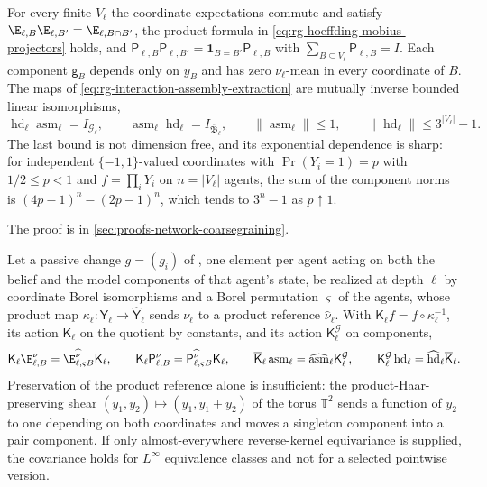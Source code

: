 For every finite $V_\ell$ the coordinate expectations commute and satisfy
$\E_{\ell,B}\E_{\ell,B'}=\E_{\ell,B\cap B'}$, the product formula
in \eqref{eq:rg-hoeffding-mobius-projectors} holds, and
$\mathsf P_{\ell,B}\mathsf P_{\ell,B'}=\mathbf 1_{B=B'}\mathsf P_{\ell,B}$ with
$\sum_{B\subseteq V_\ell}\mathsf P_{\ell,B}=I$. Each component $\mathsf g_B$
depends only on $y_B$ and has zero $\nu_\ell$-mean in every coordinate of $B$. The
maps of \eqref{eq:rg-interaction-assembly-extraction} are mutually inverse bounded
linear isomorphisms,
\begin{equation}
\operatorname{hd}_\ell\operatorname{asm}_\ell=I_{\mathcal G_\ell},
\qquad
\operatorname{asm}_\ell\operatorname{hd}_\ell=I_{\overline{\mathfrak B}_\ell},
\qquad
\lVert\operatorname{asm}_\ell\rVert\le1,
\qquad
\lVert\operatorname{hd}_\ell\rVert\le3^{\lvert V_\ell\rvert}-1 .
\label{eq:rg-hoeffding-inverse-and-bounds}
\end{equation}
The last bound is not dimension free, and its exponential dependence is sharp: for independent $\{-1,1\}$-valued coordinates with
$\Pr(Y_i=1)=p$ with $1/2\leq p<1$ and $f=\prod_iY_i$ on $n=\lvert V_\ell\rvert$ agents, the sum of
the component norms is $(4p-1)^n-(2p-1)^n$, which tends to $3^n-1$ as $p\uparrow1$.

The proof is in \cref{sec:proofs-network-coarsegraining}.

Let a passive change $g=(g_i)$ of , one element per agent acting
on both the belief and the model components of that agent's state, be realized at
depth $\ell$ by coordinate Borel isomorphisms and a Borel permutation $\varsigma$ of
the agents, whose product map $\kappa_\ell:\mathsf Y_\ell\to\widehat{\mathsf
Y}_\ell$ sends $\nu_\ell$ to a product reference $\widehat\nu_\ell$. With
$\mathsf K_\ell f=f\circ\kappa_\ell^{-1}$, its action $\overline{\mathsf K}_\ell$
on the quotient by constants, and its action $\mathsf K^{\mathcal G}_\ell$ on
components,
\begin{equation}
\mathsf K_\ell\E^{\nu}_{\ell,B}=\E^{\widehat\nu}_{\ell,\varsigma B}\mathsf K_\ell,
\qquad
\mathsf K_\ell\mathsf P^{\nu}_{\ell,B}=\mathsf P^{\widehat\nu}_{\ell,\varsigma B}\mathsf K_\ell,
\qquad
\overline{\mathsf K}_\ell\operatorname{asm}_\ell
=\widehat{\operatorname{asm}}_\ell\mathsf K^{\mathcal G}_\ell,
\qquad
\mathsf K^{\mathcal G}_\ell\operatorname{hd}_\ell
=\widehat{\operatorname{hd}}_\ell\overline{\mathsf K}_\ell.
\label{eq:rg-hoeffding-gauge-covariance}
\end{equation}
Preservation of the product reference alone is insufficient: the
product-Haar-preserving shear $(y_1,y_2)\mapsto(y_1,y_1+y_2)$ of the torus
$\mathbb T^2$ sends a function of $y_2$ to one depending on both coordinates and
moves a singleton component into a pair component. If only almost-everywhere
reverse-kernel equivariance is supplied, the covariance holds for $L^\infty$
equivalence classes and not for a selected pointwise version.

